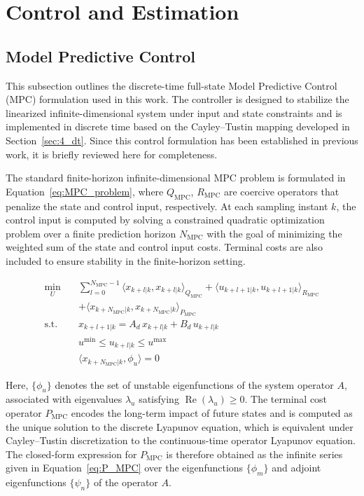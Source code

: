 \section{Control and Estimation} \label{sec:control}

\subsection{Model Predictive Control} \label{sec:mpc}

This subsection outlines the discrete-time full-state Model Predictive Control (MPC) formulation used in this work. The controller is designed to stabilize the linearized infinite-dimensional system under input and state constraints and is implemented in discrete time based on the Cayley--Tustin mapping developed in Section~\ref{sec:4_dt}. Since this control formulation has been established in previous work\autocite{Moadeli2025Model}, it is briefly reviewed here for completeness.

The standard finite-horizon infinite-dimensional MPC problem is formulated in Equation~\ref{eq:MPC_problem}, where $Q_{\mathrm{MPC}}$, $R_{\mathrm{MPC}}$ are coercive operators that penalize the state and control input, respectively. At each sampling instant $k$, the control input is computed by solving a constrained quadratic optimization problem over a finite prediction horizon $N_{\mathrm{MPC}}$ with the goal of minimizing the weighted sum of the state and control input costs. Terminal costs are also included to ensure stability in the finite-horizon setting.

\begin{equation} \label{eq:MPC_problem}
\begin{aligned}
\min_{U} \quad & \sum_{l=0}^{N_{\mathrm{MPC}} - 1} \langle x_{k+l|k}, x_{k+l|k} \rangle_{Q_{\mathrm{MPC}}} + \langle u_{k+l+1|k}, u_{k+l+1|k} \rangle_{R_{\mathrm{MPC}}} \\
&+ \langle x_{k+N_{\mathrm{MPC}}|k}, x_{k+N_{\mathrm{MPC}}|k} \rangle_{P_{\mathrm{MPC}}} \\
\text{s.t.} \quad & x_{k+l+1|k} = A_d\, x_{k+l|k} + B_d\, u_{k+l|k} \\
& u^{\min} \leq u_{k+l|k} \leq u^{\max} \\
& \langle x_{k+N_{\mathrm{MPC}}|k}, \phi_u \rangle = 0
\end{aligned}
\end{equation}

Here, $\{\phi_u\}$ denotes the set of unstable eigenfunctions of the system operator $A$, associated with eigenvalues $\lambda_u$ satisfying $\operatorname{Re}(\lambda_u) \geq 0$. The terminal cost operator $P_{\mathrm{MPC}}$ encodes the long-term impact of future states and is computed as the unique solution to the discrete Lyapunov equation, which is equivalent under Cayley--Tustin discretization to the continuous-time operator Lyapunov equation\autocite{Curtain2020Introduction,Khatibi2021Model}. The closed-form expression for $P_{\mathrm{MPC}}$ is therefore obtained as the infinite series given in Equation~\ref{eq:P_MPC} over the eigenfunctions $\{\phi_m\}$ and adjoint eigenfunctions $\{\psi_n\}$ of the operator $A$.

